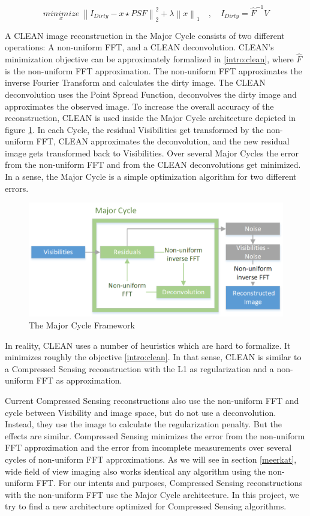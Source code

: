 \begin{equation}\label{intro:clean}
\underset{x}{minimize} \: \left \|  I_{Dirty} - x \star PSF \right \|_2^2 + \lambda \left \| x \right \|_1 \quad, \quad I_{Dirty} = \hat{F}^{-1} V
\end{equation}

A CLEAN image reconstruction in the Major Cycle consists of two different operations: A non-uniform FFT, and a CLEAN deconvolution. CLEAN's minimization objective can be approximately formalized in \eqref{intro:clean}, where $\hat{F}$ is the non-uniform FFT approximation. The non-uniform FFT approximates the inverse Fourier Transform and calculates the dirty image. The CLEAN deconvolution uses the Point Spread Function, deconvolves the dirty image and approximates the observed image. To increase the overall accuracy of the reconstruction, CLEAN is used inside the Major Cycle architecture depicted in figure \ref{intro:major}. In each Cycle, the residual Visibilities get transformed by the non-uniform FFT, CLEAN approximates the deconvolution, and the new residual image gets transformed back to Visibilities. Over several Major Cycles the error from the non-uniform FFT and from the CLEAN deconvolutions get minimized. In a sense, the Major Cycle is a simple optimization algorithm for two different errors.

\begin{figure}
	\centering
	\includegraphics[width=0.80\linewidth]{./chapters/01.intro/Major-Minor.png}
	\caption{The Major Cycle Framework}
	\label{intro:major}
\end{figure}


In reality, CLEAN uses a number of heuristics which are hard to formalize. It minimizes roughly the objective \eqref{intro:clean}. In that sense, CLEAN is similar to a Compressed Sensing reconstruction with the L1 as regularization and a non-uniform FFT as approximation.

Current Compressed Sensing reconstructions also use the non-uniform FFT and cycle between Visibility and image space\cite{girard2015sparse,dabbech2018cygnus}, but do not use a deconvolution. Instead, they use the image to calculate the regularization penalty. But the effects are similar. Compressed Sensing minimizes the error from the non-uniform FFT approximation and the error from incomplete measurements over several cycles of non-uniform FFT approximations. As we will see in section \ref{meerkat}, wide field of view imaging also works identical any algorithm using the non-uniform FFT. For our intents and purposes, Compressed Sensing reconstructions with the non-uniform FFT use the Major Cycle architecture. In this project, we try to find a new architecture optimized for Compressed Sensing algorithms.

 






